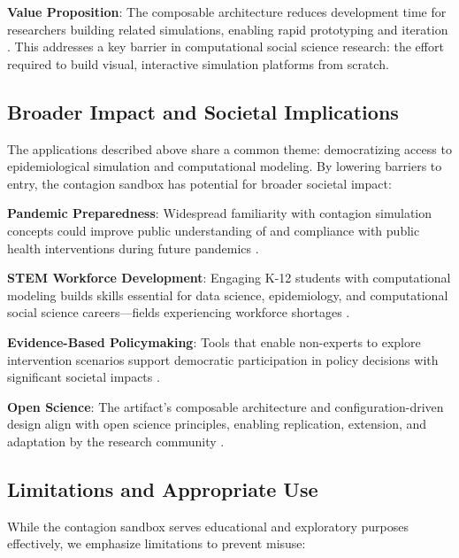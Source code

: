 \textbf{Value Proposition}: The composable architecture reduces development time for researchers building related simulations, enabling rapid prototyping and iteration \cite{gamma1994design}. This addresses a key barrier in computational social science research: the effort required to build visual, interactive simulation platforms from scratch.

\subsection{Broader Impact and Societal Implications}

The applications described above share a common theme: democratizing access to epidemiological simulation and computational modeling. By lowering barriers to entry, the contagion sandbox has potential for broader societal impact:

\textbf{Pandemic Preparedness}: Widespread familiarity with contagion simulation concepts could improve public understanding of and compliance with public health interventions during future pandemics \cite{van2021fighting}.

\textbf{STEM Workforce Development}: Engaging K-12 students with computational modeling builds skills essential for data science, epidemiology, and computational social science careers---fields experiencing workforce shortages \cite{national2020building}.

\textbf{Evidence-Based Policymaking}: Tools that enable non-experts to explore intervention scenarios support democratic participation in policy decisions with significant societal impacts \cite{saltelli2020five}.

\textbf{Open Science}: The artifact's composable architecture and configuration-driven design align with open science principles, enabling replication, extension, and adaptation by the research community \cite{munafo2017manifesto}.

\subsection{Limitations and Appropriate Use}

While the contagion sandbox serves educational and exploratory purposes effectively, we emphasize limitations to prevent misuse:

